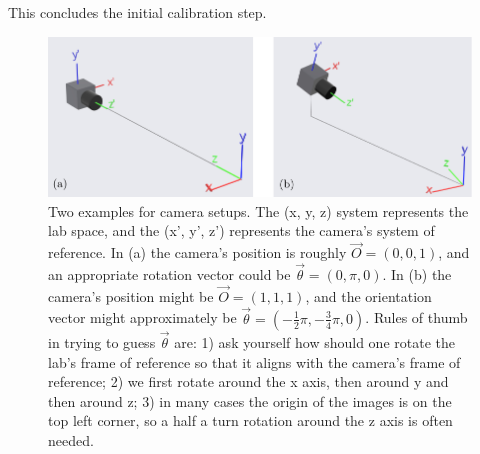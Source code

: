 \documentclass[10pt,a4paper]{article}
\begin{document}
This concludes the initial calibration step.






\begin{figure}[!ht]
	\centering
	\includegraphics[width=\textwidth]{Cam_pos_examples.pdf}
	\caption{Two examples for camera setups. The (x, y, z) system represents the lab space, and the (x', y', z') represents the camera's system of reference. In (a) the camera's position is roughly $\vec{O} = (0,0,1)$, and an appropriate rotation vector could be $\vec{\theta} = (0,\pi,0)$. In (b) the camera's position might be $\vec{O} = (1,1,1)$, and the orientation vector might approximately be $\vec{\theta} = (-\frac{1}{2}\pi,-\frac{3}{4}\pi,0)$. Rules of thumb in trying to guess $\vec{\theta}$ are: 1) ask yourself how should one rotate the lab's frame of reference so that it aligns with the camera's frame of reference; 2) we first rotate around the x axis, then around y and then around z; 3) in many cases the origin of the images is on the top left corner, so a half a turn rotation around the z axis is often needed. \label{fig:cam_pos_example}}
\end{figure}
\end{document}
